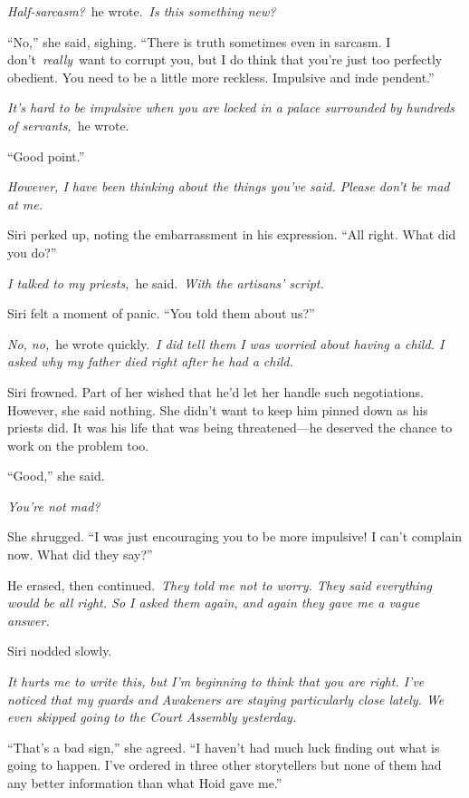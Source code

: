 \textit{Half-sarcasm?}~he wrote.~\textit{Is this something new?}

“No,” she said, sighing. “There is truth sometimes even in sarcasm. I don’t~\textit{really}~want to corrupt you, but I do think that you’re just too perfectly obedient. You need to be a little more reckless. Impulsive and inde pendent.”

\textit{It’s hard to be impulsive when you are locked in a palace surrounded by hundreds of servants,}~he wrote.

“Good point.”

\textit{However, I have been thinking about the things you’ve said. Please don’t be mad at me.}

Siri perked up, noting the embarrassment in his expression. “All right. What did you do?”

\textit{I talked to my priests,}~he said.~\textit{With the artisans’ script.}

Siri felt a moment of panic. “You told them about us?”

\textit{No, no,}~he wrote quickly.~\textit{I did tell them I was worried about having a child. I asked why my father died right after he had a child.}

Siri frowned. Part of her wished that he’d let her handle such negotiations. However, she said nothing. She didn’t want to keep him pinned down as his priests did. It was his life that was being threatened—he deserved the chance to work on the problem too.

“Good,” she said.

\textit{You’re not mad?}

She shrugged. “I was just encouraging you to be more impulsive! I can’t complain now. What did they say?”

He erased, then continued.~\textit{They told me not to worry. They said everything would be all right. So I asked them again, and again they gave me a vague answer.}

Siri nodded slowly.

\textit{It hurts me to write this, but I’m beginning to think that you are right. I’ve noticed that my guards and Awakeners are staying particularly close lately. We even skipped going to the Court Assembly yesterday.}

“That’s a bad sign,” she agreed. “I haven’t had much luck finding out what is going to happen. I’ve ordered in three other storytellers but none of them had any better information than what Hoid gave me.”

